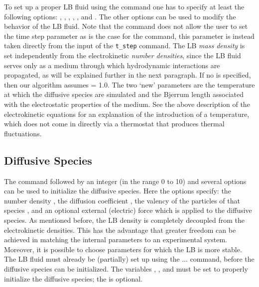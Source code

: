 To set up a proper LB fluid using the  command one has to
specify at least the following options: , , ,
, , and . The other options can be used to 
modify the behavior of the LB fluid. Note that the  command 
does not allow the user to set the time step parameter  as is the case for
the  command, this parameter is instead taken directly from the input
of the  \texttt{t\_step} command. The LB \emph{mass density} is set 
independently from the electrokinetic \emph{number densities}, since the LB fluid 
serves only as a medium through which hydrodynamic interactions are propagated, 
as will be explained further in the next paragraph. If no  is
specified, then our algorithm assumes  = 1.0. The two `new'
parameters are  the temperature at which the diffusive species are simulated
and  the Bjerrum length associated with the electrostatic 
properties of the medium. See the above description of the electrokinetic 
equations for an explanation of the introduction of a temperature, which does 
not come in directly via a thermostat that produces thermal fluctuations.

\subsection{\label{ssec:ek-diff-species}Diffusive Species}

\begin{essyntax}
  \begin{features}
  \end{features}
\end{essyntax}
The  command followed by an integer 
(in the range 0 to 10) and several options can be used to initialize the 
diffusive species. Here the options specify: the number density
, the diffusion coefficient , the valency of the particles 
of that species , and an optional external (electric) force which
is applied to the diffusive species. As mentioned before, the LB density is 
completely decoupled from the electrokinetic densities. This has the advantage
that greater freedom can be achieved in matching the internal parameters to an
experimental system. Moreover, it is possible to choose parameters for which
the LB is more stable. The LB fluid must already be (partially) set up using the 
  ... command, before the diffusive species can
be initialized. The variables , , and  must be 
set to properly initialize the diffusive species; the  is
optional.

